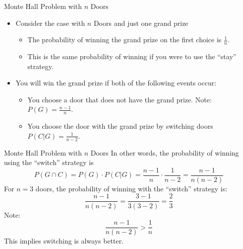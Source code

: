 \documentclass[
  ignorenonframetext,
]{beamer}
\providecommand{\tightlist}{%
  \setlength{\itemsep}{0pt}\setlength{\parskip}{0pt}}
\begin{document}
\begin{frame}{Monte Hall Problem with \(n\) Doors}
\protect\hypertarget{monte-hall-problem-with-n-doors}{}
\begin{itemize}
\item
  Consider the case with \(n\) Doors and just one grand prize

  \begin{itemize}
  \tightlist
  \item
    The probability of winning the grand prize on the first choice is
    \(\frac{1}{n}\).
  \item
    This is the same probability of winning if you were to use the
    ``stay'' strategy.
  \end{itemize}
\item
  You will win the grand prize if both of the following events occur:

  \begin{itemize}
  \tightlist
  \item
    You choose a door that does not have the grand prize. Note:
    \(P(G)=\frac{n-1}{n}\).
  \item
    You choose the door with the grand prize by switching doors
    \(P(C|G)=\frac{1}{n-2}\).
  \end{itemize}
\end{itemize}
\end{frame}

\begin{frame}{Monte Hall Problem with \(n\) Doors}
\protect\hypertarget{monte-hall-problem-with-n-doors-1}{}
In other words, the probability of winning using the ``switch'' strategy
is
\[P(G \cap C)=P(G)\cdot P(C|G)=\frac{n-1}{n}\cdot \frac{1}{n-2}=\frac{n-1}{n(n-2)}\]
For \(n=3\) doors, the probability of winning with the ``switch''
strategy is: \[\frac{n-1}{n(n-2)}=\frac{3-1}{3(3-2)}=\frac{2}{3}\] Note:
\[\frac{n-1}{n(n-2)}> \frac{1}{n}\] This implies switching is always
better.
\end{frame}
\end{document}
